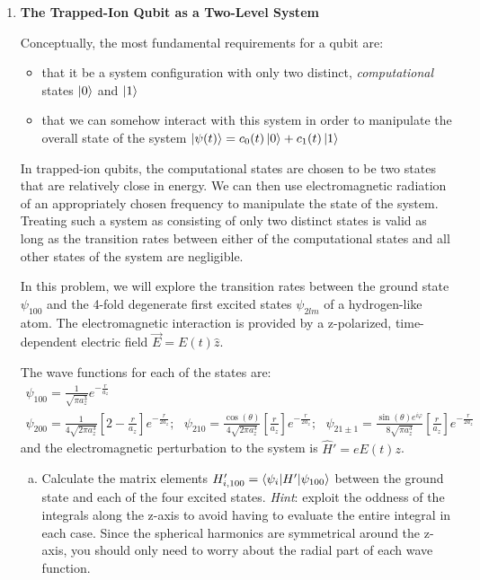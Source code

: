 \documentclass[10pt,letterpaper]{article}
\begin{document}
\begin{enumerate}
\begin{enumerate}[a)]
\end{enumerate}

\item \textbf{The Trapped-Ion Qubit as a Two-Level System}

Conceptually, the most fundamental requirements for a qubit are:
\begin{itemize}

\item that it be a system configuration with only two distinct, \textit{computational} states $\ket{0}$ and $\ket{1}$

\item that we can somehow interact with this system in order to manipulate the overall state of the system $\ket{\psi(t)} = c_{0}(t)\ket{0} + c_{1}(t)\ket{1}$

\end{itemize}

In trapped-ion qubits, the computational states are chosen to be two states that are relatively close in energy. We can then use electromagnetic radiation of an appropriately chosen frequency to manipulate the state of the system. Treating such a system as consisting of only two distinct states is valid as long as the transition rates between either of the computational states and all other states of the system are negligible.

In this problem, we will explore the transition rates between the ground state $\psi_{100}$ and the 4-fold degenerate first excited states $\psi_{2lm}$ of a hydrogen-like atom. The electromagnetic interaction is provided by a z-polarized, time-dependent electric field $\vec{E} = E(t)\hat{z}$.

The wave functions for each of the states are:
\begin{gather*}
\psi_{100} = \frac{1}{\sqrt{\pi a_{z}^{3}}} e^{-\frac{r}{a_{z}}} \\
\psi_{200} = \frac{1}{4\sqrt{2\pi a_{z}^{3}}} \left[ 2 - \frac{r}{a_{z}} \right]e^{-\frac{r}{2a_{z}}};\ \ \ \psi_{210} = \frac{\cos(\theta)}{4\sqrt{2\pi a_{z}^{3}}} \left[ \frac{r}{a_{z}} \right] e^{-\frac{r}{2a_{z}}};\ \ \ \psi_{21\pm1} = \frac{\sin(\theta)e^{i\varphi}}{8\sqrt{\pi a_{z}^{3}}} \left[ \frac{r}{a_{z}} \right] e^{-\frac{r}{2a_{z}}}
\end{gather*}
and the electromagnetic perturbation to the system is $\hat{H}' = eE(t)z$. 

\begin{enumerate}[a)]

\item Calculate the matrix elements $H_{i, 100}' = \braket{\psi_{i} | H' | \psi_{100}}$ between the ground state and each of the four excited states. \textit{Hint}: exploit the oddness of the integrals along the z-axis to avoid having to evaluate the entire integral in each case. Since the spherical harmonics are symmetrical around the z-axis, you should only need to worry about the radial part of each wave function.


\end{enumerate}
\end{enumerate}
\end{document}

